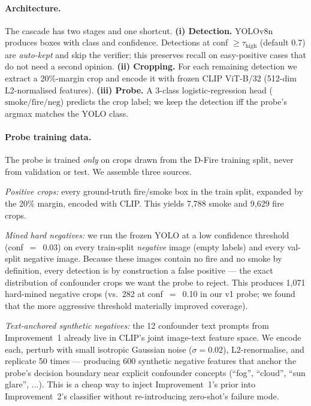 \documentclass{article}
\begin{document}
\paragraph{Architecture.} The cascade has two stages and one shortcut.
\textbf{(i) Detection.} YOLOv8n produces boxes with class and
confidence. Detections at conf $\geq \tau_{\text{high}}$ (default 0.7) are
\emph{auto-kept} and skip the verifier; this preserves recall on easy-positive
cases that do not need a second opinion. \textbf{(ii) Cropping.} For each
remaining detection we extract a 20\%-margin crop and encode it with frozen
CLIP ViT-B/32 (512-dim L2-normalised features). \textbf{(iii) Probe.} A
3-class logistic-regression head ($\text{smoke}/\text{fire}/\text{neg}$)
predicts the crop label; we keep the detection iff the probe's argmax matches
the YOLO class.

\paragraph{Probe training data.} The probe is trained \emph{only} on
crops drawn from the D-Fire training split, never from validation or test.
We assemble three sources.

\textit{Positive crops:} every ground-truth fire/smoke box in the train split,
expanded by the 20\% margin, encoded with CLIP. This yields 7{,}788 smoke and
9{,}629 fire crops.

\textit{Mined hard negatives:} we run the frozen YOLO at a low confidence
threshold (conf~$=$~0.03) on every train-split \emph{negative} image (empty
labels) and every val-split negative image. Because these images contain no
fire and no smoke by definition, every detection is by construction a false
positive --- the exact distribution of confounder crops we want the probe to
reject. This produces 1{,}071 hard-mined negative crops (vs.\ 282 at
conf~$=$~0.10 in our v1 probe; we found that the more aggressive threshold
materially improved coverage).

\textit{Text-anchored synthetic negatives:} the 12 confounder text prompts
from Improvement~1 already live in CLIP's joint image-text feature space.
We encode each, perturb with small isotropic Gaussian noise
($\sigma{=}0.02$), L2-renormalise, and replicate 50 times --- producing 600
synthetic negative features that anchor the probe's decision boundary near
explicit confounder concepts (``fog'', ``cloud'', ``sun glare'', $\dots$).
This is a cheap way to inject Improvement~1's prior into Improvement~2's
classifier without re-introducing zero-shot's failure mode.
\end{document}
